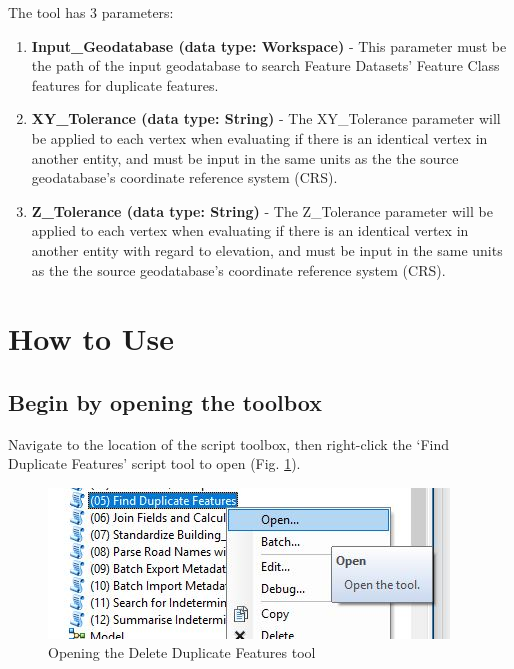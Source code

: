 \documentclass[openany]{book}
\theoremstyle{definition}
\theoremstyle{definition}
\theoremstyle{definition}
\theoremstyle{remark}
\begin{document}
The tool has 3 parameters:

\begin{enumerate}
\def\labelenumi{\arabic{enumi}.}
\item
  \textbf{Input\_Geodatabase (data type: Workspace)} - This parameter
  must be the path of the input geodatabase to search Feature Datasets'
  Feature Class features for duplicate features.
\item
  \textbf{XY\_Tolerance (data type: String)} - The XY\_Tolerance
  parameter will be applied to each vertex when evaluating if there is
  an identical vertex in another entity, and must be input in the same
  units as the the source geodatabase's coordinate reference system
  (CRS).
\item
  \textbf{Z\_Tolerance (data type: String)} - The Z\_Tolerance parameter
  will be applied to each vertex when evaluating if there is an
  identical vertex in another entity with regard to elevation, and must
  be input in the same units as the the source geodatabase's coordinate
  reference system (CRS).
\end{enumerate}

\section{How to Use}\label{how-to-use-3}

\subsection{Begin by opening the
toolbox}\label{begin-by-opening-the-toolbox-3}

Navigate to the location of the script toolbox, then right-click the
`Find Duplicate Features' script tool to open (Fig. \ref{fig:delFopen}).

\begin{figure}[H]

{\centering \includegraphics{figures/delF-opentool} 

}

\caption{Opening the Delete Duplicate Features tool}\label{fig:delFopen}
\end{figure}
\end{document}
